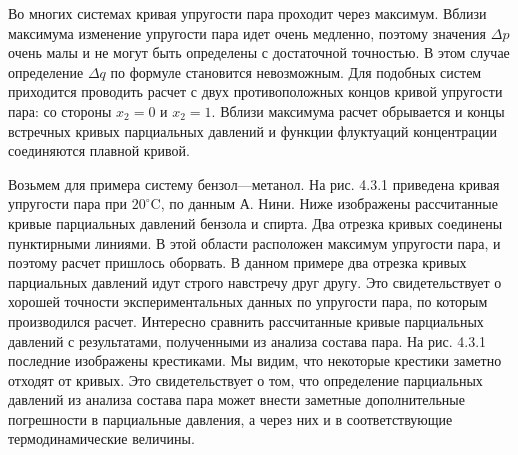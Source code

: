 Во многих системах кривая упругости пара проходит через максимум.
Вблизи максимума изменение упругости пара идет очень медленно,
поэтому значения $\Delta p$ очень малы и не могут быть определены
с достаточной точностью. В этом случае определение $\Delta q$ по
формуле  становится невозможным. Для подобных систем
приходится проводить расчет с двух противоположных концов кривой
упругости пара: со стороны $x_2=0$ и $x_2=1$. Вблизи максимума
расчет обрывается и концы встречных кривых парциальных давлений и
функции флуктуаций концентрации соединяются плавной кривой.

Возьмем для примера систему бензол---метанол. На рис. 4.3.1
приведена кривая упругости пара при $20^{\circ}$C, по данным А.
Нини. Ниже изображены рассчитанные кривые парциальных
давлений бензола и спирта. Два отрезка кривых соединены
пунктирными линиями. В этой области расположен максимум упругости
пара, и поэтому расчет пришлось оборвать. В данном примере два
отрезка кривых парциальных давлений идут строго навстречу друг
другу. Это свидетельствует о хорошей точности экспериментальных
данных по упругости пара, по которым производился расчет.
Интересно сравнить рассчитанные кривые парциальных давлений с
результатами, полученными из анализа состава пара. На рис. 4.3.1
последние изображены крестиками. Мы видим, что некоторые крестики
заметно отходят от кривых. Это свидетельствует о том, что
определение парциальных давлений из анализа состава пара может
внести заметные дополнительные погрешности в парциальные
давления, а через них и в соответствующие термодинамические
величины.\thispagestyle{empty}

